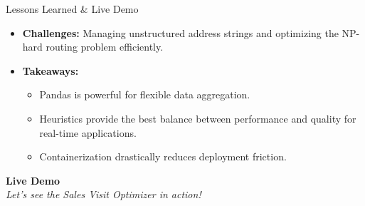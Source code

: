 \begin{frame}{Lessons Learned \& Live Demo}
\begin{itemize}
    \item \textbf{Challenges:} Managing unstructured address strings and optimizing the NP-hard routing problem efficiently.
    \item \textbf{Takeaways:} 
        \begin{itemize}
            \item Pandas is powerful for flexible data aggregation.
            \item Heuristics provide the best balance between performance and quality for real-time applications.
            \item Containerization drastically reduces deployment friction.
        \end{itemize}
\end{itemize}
\vspace{0.8cm}
\begin{center}
    {\Large \textbf{Live Demo}} \\
    \vspace{0.2cm}
    \textit{Let's see the Sales Visit Optimizer in action!}
\end{center}
\end{frame}
